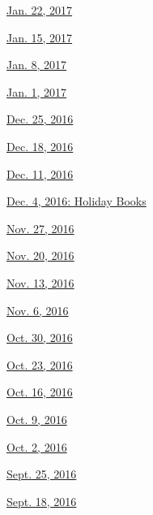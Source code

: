 \href{http://www.nytimes.com/indexes/2017/01/22/todayspaper/index.html\#bookreview}{Jan.
22, 2017}

\href{http://www.nytimes.com/indexes/2017/01/15/todayspaper/index.html\#bookreview}{Jan.
15, 2017}

\href{http://www.nytimes.com/indexes/2017/01/08/todayspaper/index.html\#bookreview}{Jan.
8, 2017}

\href{http://www.nytimes.com/indexes/2017/01/01/todayspaper/index.html\#bookreview}{Jan.
1, 2017}

\href{http://www.nytimes.com/indexes/2016/12/25/todayspaper/index.html\#bookreview}{Dec.
25, 2016}

\href{http://www.nytimes.com/indexes/2016/12/18/todayspaper/index.html\#bookreview}{Dec.
18, 2016}

\href{http://www.nytimes.com/indexes/2016/12/11/todayspaper/index.html\#bookreview}{Dec.
11, 2016}

\href{http://www.nytimes.com/indexes/2016/12/11/todayspaper/index.html\#bookreview}{Dec.
4, 2016: Holiday Books}

\href{http://www.nytimes.com/indexes/2016/11/27/todayspaper/index.html\#bookreview}{Nov.
27, 2016}

\href{http://www.nytimes.com/indexes/2016/11/20/todayspaper/index.html\#bookreview}{Nov.
20, 2016}

\href{http://www.nytimes.com/indexes/2016/11/13/todayspaper/index.html\#bookreview}{Nov.
13, 2016}

\href{http://www.nytimes.com/indexes/2016/11/06/todayspaper/index.html\#bookreview}{Nov.
6, 2016}

\href{http://www.nytimes.com/indexes/2016/10/30/todayspaper/index.html\#bookreview}{Oct.
30, 2016}

\href{http://www.nytimes.com/indexes/2016/10/23/todayspaper/index.html\#bookreview}{Oct.
23, 2016}

\href{http://www.nytimes.com/indexes/2016/10/16/todayspaper/index.html\#bookreview}{Oct.
16, 2016}

\href{http://www.nytimes.com/indexes/2016/10/09/todayspaper/index.html\#bookreview}{Oct.
9, 2016}

\href{http://www.nytimes.com/indexes/2016/10/02/todayspaper/index.html\#bookreview}{Oct.
2, 2016}

\href{http://www.nytimes.com/indexes/2016/09/25/todayspaper/index.html\#bookreview}{Sept.
25, 2016}

\href{http://www.nytimes.com/indexes/2016/09/18/todayspaper/index.html\#bookreview}{Sept.
18, 2016}


